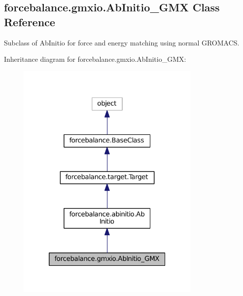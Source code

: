 \hypertarget{classforcebalance_1_1gmxio_1_1AbInitio__GMX}{\subsection{forcebalance.\-gmxio.\-Ab\-Initio\-\_\-\-G\-M\-X Class Reference}
\label{classforcebalance_1_1gmxio_1_1AbInitio__GMX}
}


Subclass of Ab\-Initio for force and energy matching using normal G\-R\-O\-M\-A\-C\-S.  




Inheritance diagram for forcebalance.\-gmxio.\-Ab\-Initio\-\_\-\-G\-M\-X\-:
\nopagebreak
\begin{figure}[H]
\begin{center}
\leavevmode
\includegraphics[width=254pt]{classforcebalance_1_1gmxio_1_1AbInitio__GMX__inherit__graph}
\end{center}
\end{figure}


